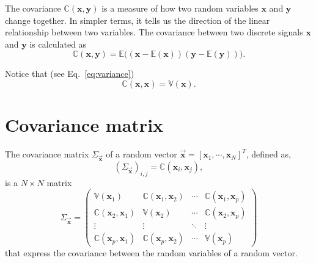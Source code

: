 The covariance $\mathbb{C}(\mathbf{x}, \mathbf{y})$ is a measure of
how two random variables $\mathbf{x}$ and $\mathbf{y}$ change
together. In simpler terms, it tells us the direction of the linear
relationship between two variables. The covariance between two
discrete signals $\mathbf{x}$ and $\mathbf{y}$ is calculated as
\begin{equation}
  \mathbb{C}(\textbf{x}, \textbf{y}) = \mathbb{E}\big((\mathbf{x}-\mathbb{E}(\mathbf{x}))(\mathbf{y}-\mathbb{E}(\mathbf{y}))\big).
\end{equation}

Notice that (see Eq.~\ref{eq:variance})
\begin{equation}
  \mathbb{C}(\mathbf{x}, \mathbf{x}) = \mathbb{V}(\mathbf{x}).
\end{equation}


\section{Covariance matrix}
\label{sec:covariance_matrix}

The covariance matrix $\Sigma_{\overrightarrow{\mathbf{x}}}$ of a random vector $\overrightarrow{\mathbf{x}}=[\mathbf{x}_1,\cdots,\mathbf{x}_N]^T$, defined as,
\begin{equation}
  (\Sigma_{\overrightarrow{\mathbf{x}}})_{i,j}=\mathbb{C}(\mathbf{x}_i,\mathbf{x}_j),
\end{equation}
is a $N\times N$ matrix
\begin{equation}
\Sigma_{\overrightarrow{\mathbf{x}}} = 
\begin{pmatrix}
\mathbb{V}(\mathbf{x}_1) & \mathbb{C}(\mathbf{x}_1, \mathbf{x}_2) & \cdots & \mathbb{C}(\mathbf{x}_1, \mathbf{x}_p) \\
\mathbb{C}(\mathbf{x}_2, \mathbf{x}_1) & \mathbb{V}(\mathbf{x}_2) & \cdots & \mathbb{C}(\mathbf{x}_2, \mathbf{x}_p) \\
\vdots & \vdots & \ddots & \vdots \\
\mathbb{C}(\mathbf{x}_p, \mathbf{x}_1) & \mathbb{C}(\mathbf{x}_p, \mathbf{x}_2) & \cdots & \mathbb{V}(\mathbf{x}_p)
\end{pmatrix}
\end{equation}
that express the covariance between the random variables of a random vector.

